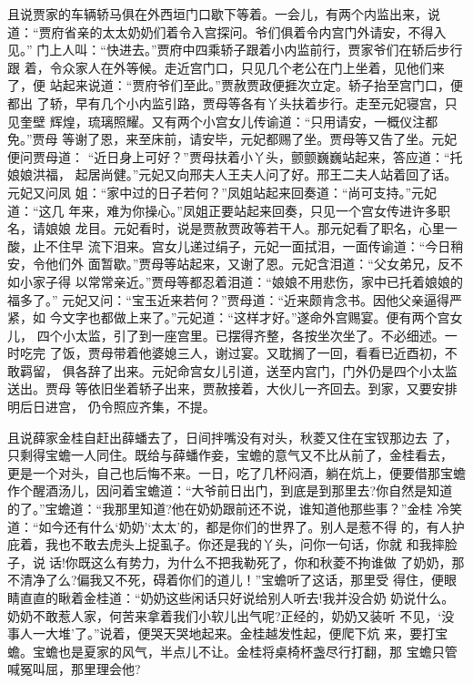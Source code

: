 且说贾家的车辆轿马俱在外西垣门口歇下等着。一会儿，有两个内监出来，说
道：“贾府省亲的太太奶奶们着令入宫探问。爷们俱着令内宫门外请安，不得入见。”
门上人叫：“快进去。”贾府中四乘轿子跟着小内监前行，贾家爷们在轿后步行跟
着，令众家人在外等候。走近宫门口，只见几个老公在门上坐着，见他们来了，便
站起来说道：“贾府爷们至此。”贾赦贾政便捱次立定。轿子抬至宫门口，便都出
了轿，早有几个小内监引路，贾母等各有丫头扶着步行。走至元妃寝宫，只见奎壁
辉煌，琉璃照耀。又有两个小宫女儿传谕道：“只用请安，一概仪注都免。”贾母
等谢了恩，来至床前，请安毕，元妃都赐了坐。贾母等又告了坐。元妃便问贾母道：
“近日身上可好？”贾母扶着小丫头，颤颤巍巍站起来，答应道：“托娘娘洪福，
起居尚健。”元妃又向邢夫人王夫人问了好。邢王二夫人站着回了话。元妃又问凤
姐：“家中过的日子若何？”凤姐站起来回奏道：“尚可支持。”元妃道：“这几
年来，难为你操心。”凤姐正要站起来回奏，只见一个宫女传进许多职名，请娘娘
龙目。元妃看时，说是贾赦贾政等若干人。那元妃看了职名，心里一酸，止不住早
流下泪来。宫女儿递过绢子，元妃一面拭泪，一面传谕道：“今日稍安，令他们外
面暂歇。”贾母等站起来，又谢了恩。元妃含泪道：“父女弟兄，反不如小家子得
以常常亲近。”贾母等都忍着泪道：“娘娘不用悲伤，家中已托着娘娘的福多了。”
元妃又问：“宝玉近来若何？”贾母道：“近来颇肯念书。因他父亲逼得严紧，如
今文字也都做上来了。”元妃道：“这样才好。”遂命外宫赐宴。便有两个宫女儿，
四个小太监，引了到一座宫里。已摆得齐整，各按坐次坐了。不必细述。一时吃完
了饭，贾母带着他婆媳三人，谢过宴。又耽搁了一回，看看已近酉初，不敢羁留，
俱各辞了出来。元妃命宫女儿引道，送至内宫门，门外仍是四个小太监送出。贾母
等依旧坐着轿子出来，贾赦接着，大伙儿一齐回去。到家，又要安排明后日进宫，
仍令照应齐集，不提。

且说薛家金桂自赶出薛蟠去了，日间拌嘴没有对头，秋菱又住在宝钗那边去
了，只剩得宝蟾一人同住。既给与薛蟠作妾，宝蟾的意气又不比从前了，金桂看去，
更是一个对头，自己也后悔不来。一日，吃了几杯闷酒，躺在炕上，便要借那宝蟾
作个醒酒汤儿，因问着宝蟾道：“大爷前日出门，到底是到那里去?你自然是知道
的了。”宝蟾道：“我那里知道?他在奶奶跟前还不说，谁知道他那些事？”金桂
冷笑道：“如今还有什么‘奶奶’‘太太’的，都是你们的世界了。别人是惹不得
的，有人护庇着，我也不敢去虎头上捉虱子。你还是我的丫头，问你一句话，你就
和我摔脸子，说话!你既这么有势力，为什么不把我勒死了，你和秋菱不拘谁做
了奶奶，那不清净了么?偏我又不死，碍着你们的道儿！”宝蟾听了这话，那里受
得住，便眼睛直直的瞅着金桂道：“奶奶这些闲话只好说给别人听去!我并没合奶
奶说什么。奶奶不敢惹人家，何苦来拿着我们小软儿出气呢?正经的，奶奶又装听
不见，‘没事人一大堆’了。”说着，便哭天哭地起来。金桂越发性起，便爬下炕
来，要打宝蟾。宝蟾也是夏家的风气，半点儿不让。金桂将桌椅杯盏尽行打翻，那
宝蟾只管喊冤叫屈，那里理会他?

